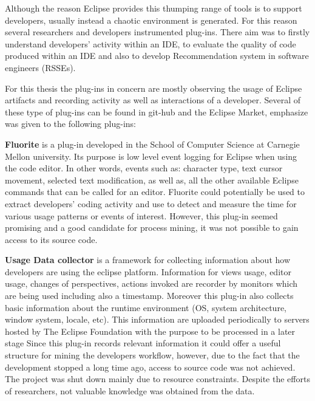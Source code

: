 Although the reason Eclipse provides this thumping range of tools is to support 
developers, usually instead a chaotic environment is generated. 
For this reason several researchers and developers instrumented plug-ins. There aim was to firstly 
understand developers' activity within an IDE, to evaluate the quality of code produced within an IDE 
and also to develop Recommendation system in software engineers (RSSEs). 

For this thesis the plug-ins in concern are mostly observing the usage of Eclipse artifacts and 
recording activity as well as interactions of a developer. 
Several of these type of plug-ins can be found in git-hub and the Eclipse Market, emphasize was given
to the following plug-ins:

\textbf{Fluorite} is a plug-in developed in the School of Computer Science 
at Carnegie Mellon university. Its purpose is low level event logging 
for Eclipse when using the code editor. In other words, events such as: 
character type, text cursor movement, 
selected text modification, as well as, all
the other available Eclipse commands that can be called for an editor.
Fluorite could potentially be used to extract developers' coding 
activity and use to detect and measure the time for various usage 
patterns or events of interest. However, this plug-in seemed promising 
and a good candidate for process mining, it was not possible to gain 
access to its source code.
 
\textbf{Usage Data collector} is a framework for collecting information about how developers 
are using the eclipse platform. Information for views usage, editor usage, 
changes of perspectives, actions invoked are recorder by monitors which
are being used including also a timestamp. Moreover this plug-in also collects 
basic information about the runtime environment (OS, system architecture, window system, 
locale, etc). This information are uploaded periodically to servers hosted by The Eclipse 
Foundation with the purpose to be processed in a later stage %
Since this plug-in records relevant information it could offer a useful structure for mining the developers workflow, 
however, due to the fact that the development stopped a long time ago, access to source code was not achieved.
The project was shut down mainly due to resource constraints. Despite the efforts of researchers, not valuable 
knowledge was obtained from the data. 

